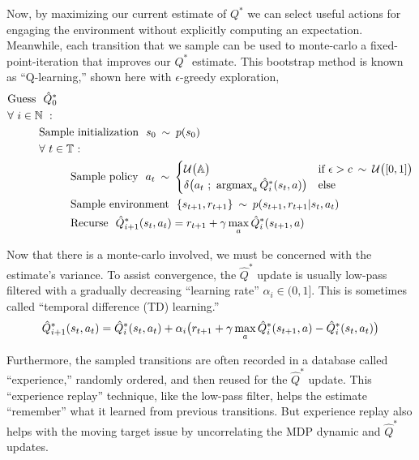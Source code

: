 Now, by maximizing our current estimate of $Q^*$ we can select useful actions for engaging the environment without explicitly computing an expectation. Meanwhile, each transition that we sample can be used to monte-carlo a fixed-point-iteration that improves our $Q^*$ estimate. This bootstrap method is known as ``Q-learning,'' shown here with $\epsilon$-greedy exploration,
\begin{align*}
&\text{Guess}\ \ \hat{Q}^*_0\\
&\forall\ i \in \mathbb{N}\ :\\
&\text{\tab Sample initialization}\ \ s_0\ \dist\ p(s_0)\\
&\text{\tab $\forall\ t \in \mathbb{T}$ :}\\
&\text{\tab \tab Sample policy}\ \ a_t\ \dist\ \begin{cases} \mathcal{U}\big{(}\mathbb{A}\big{)} &\text{if}\ \epsilon > c\ \dist\ \mathcal{U}\big{(}[0,1]\big{)} \\ \delta\big{(}a_t\ ;\ \argmax_{a} \hat{Q}^*_i(s_t, a)\big{)} &\text{else}\end{cases}\\
&\text{\tab \tab Sample environment}\ \ \{s_{t+1}, r_{t+1}\}\ \dist\ p{(}s_{t+1}, r_{t+1} | s_t, a_t{)}\\
&\text{\tab \tab Recurse}\ \ \hat{Q}^*_{i+1}{(}s_t, a_t{)} = r_{t+1} + \gamma \max_{a} \hat{Q}^*_i{(}s_{t+1}, a{)}
\end{align*}

Now that there is a monte-carlo involved, we must be concerned with the estimate's variance. To assist convergence, the $\hat{Q}^*$ update is usually low-pass filtered with a gradually decreasing ``learning rate'' $\alpha_i \in (0,1]$. This is sometimes called ``temporal difference (TD) learning.''
\begin{equation*}
\hat{Q}^*_{i+1}{(}s_t, a_t{)} = \hat{Q}^*_i{(}s_t, a_t{)} + \alpha_i \big{(}r_{t+1} + \gamma \max_{a} \hat{Q}^*_i{(}s_{t+1}, a{)} - \hat{Q}^*_i{(}s_t, a_t{)}\big{)}
\end{equation*}

Furthermore, the sampled transitions are often recorded in a database called ``experience,'' randomly ordered, and then reused for the $\hat{Q}^*$ update. This ``experience replay'' technique, like the low-pass filter, helps the estimate ``remember'' what it learned from previous transitions. But experience replay also helps with the moving target issue by uncorrelating the MDP dynamic and $\hat{Q}^*$ updates.\\

